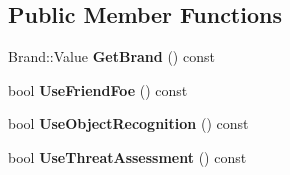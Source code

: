 \subsection*{Public Member Functions}
\begin{DoxyCompactItemize}
\item 
Brand\+::\+Value {\bfseries Get\+Brand} () const \hypertarget{classUnit_1_1Computer_1_1RADARLIM_ae1e4d9ddb1721403e94e80d8f2a674fd}{}\label{classUnit_1_1Computer_1_1RADARLIM_ae1e4d9ddb1721403e94e80d8f2a674fd}

\item 
bool {\bfseries Use\+Friend\+Foe} () const \hypertarget{classUnit_1_1Computer_1_1RADARLIM_ac8f9c74c31ca660b7cf9770b91a9d77c}{}\label{classUnit_1_1Computer_1_1RADARLIM_ac8f9c74c31ca660b7cf9770b91a9d77c}

\item 
bool {\bfseries Use\+Object\+Recognition} () const \hypertarget{classUnit_1_1Computer_1_1RADARLIM_a1a9ae6e8bae43d1c04583f7721bc4cfe}{}\label{classUnit_1_1Computer_1_1RADARLIM_a1a9ae6e8bae43d1c04583f7721bc4cfe}

\item 
bool {\bfseries Use\+Threat\+Assessment} () const \hypertarget{classUnit_1_1Computer_1_1RADARLIM_aba99b133372a1da26abc1b64b68f6586}{}\label{classUnit_1_1Computer_1_1RADARLIM_aba99b133372a1da26abc1b64b68f6586}

\end{DoxyCompactItemize}
